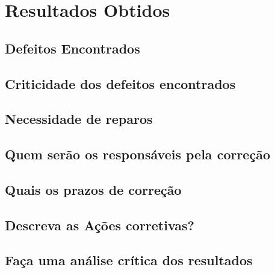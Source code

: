 \chapter[Resultados Obtidos]{Resultados Obtidos}

\section{Defeitos Encontrados}
\section{Criticidade dos defeitos encontrados}
\section{Necessidade de reparos}
\section{Quem serão os responsáveis pela correção}
\section{Quais os prazos de correção}
\section{Descreva as Ações corretivas?}
\section{Faça uma análise crítica dos resultados}
